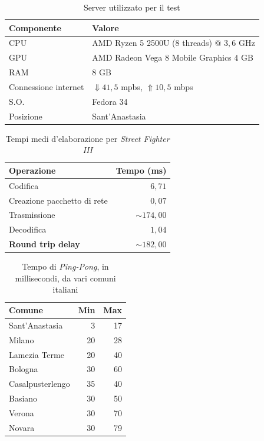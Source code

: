 \begin{table}[H]
	\centering
	\begin{tabular}{||l l||}
		\hline
		Componente & Valore \\
		\hline\hline				
		\hline
		CPU & AMD Ryzen 5 2500U (8 threads) @ $3,6$ GHz \\
		\hline
		GPU & AMD Radeon Vega 8 Mobile Graphics $4$ GB \\
		\hline
		RAM & 8 GB \\
		\hline
		Connessione internet & $\Downarrow 41,5$ mpbs, $\Uparrow 10,5$ mbps \\
		\hline
		S.O. & Fedora 34 \\
		\hline
		Posizione & Sant'Anastasia \\
		\hline
	\end{tabular}

	\caption{Server utilizzato per il test}
	\label{table:ServerUsato}
\end{table}

\begin{table}[H]
	\centering
	\begin{tabular}{||l r||}
		\hline
		Operazione & Tempo (ms) \\
		\hline\hline				
		\hline
		Codifica & $6,71$ \\
		\hline
		Creazione pacchetto di rete & $0,07$ \\
		\hline
		Trasmissione & $\sim 174,00$ \\
		\hline
		Decodifica & $1,04$ \\
		\hline\hline
		\textbf{Round trip delay} & \textbf{$\sim 182,00$} \\
		\hline
	\end{tabular}

	\caption{Tempi medi d'elaborazione per \textit{Street Fighter III}}
	\label{table:LatenzaOttenuta}
\end{table}

\begin{table}[H]
	\centering
	\begin{tabular}{||l r r||}
		\hline
		Comune & Min & Max \\
		\hline\hline
		\hline
		Sant'Anastasia & 3 & 17 \\
		\hline
		Milano & 20 & 28 \\
		\hline
		Lamezia Terme & 20 & 40 \\		
		\hline
		Bologna & 30 & 60 \\
		\hline
		Casalpusterlengo & 35 & 40 \\
		\hline
		Basiano & 30 & 50 \\
		\hline
		Verona & 30 & 70 \\
		\hline
		Novara & 30 & 79 \\
		\hline
	\end{tabular}

	\caption{Tempo di \textit{Ping-Pong}, in millisecondi, da vari comuni italiani}
	\label{table:PingPong}
\end{table}



